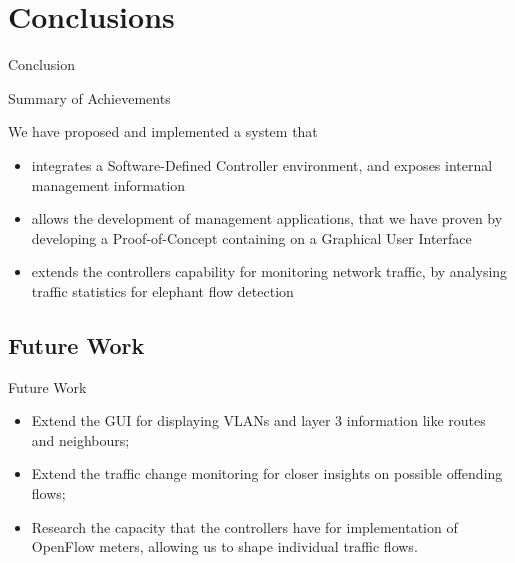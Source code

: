 \documentclass[aspectratio=43]{beamer}
\begin{document}
\section{Conclusions}
\begin{frame}[plain]
    \centering
        \Huge{Conclusion}
\end{frame}


\begin{frame}{Summary of Achievements}
    \item We have proposed and implemented a system that
    \begin{itemize}
        \item integrates a Software-Defined Controller environment, and exposes internal
            management information
        \item allows the development of management applications, that we have proven 
            by developing a Proof-of-Concept containing on a Graphical User Interface
        \item extends the controllers capability for monitoring network traffic, 
            by analysing traffic statistics for elephant flow detection
    \end{itemize}
\end{frame}

\subsection{Future Work}

\begin{frame}{Future Work}
    \begin{itemize}
        \item Extend the GUI for displaying VLANs and layer 3 information like routes and neighbours;
        \item Extend the traffic change monitoring for closer insights on possible offending flows;
        \item Research the capacity that the controllers have for implementation of OpenFlow meters,
            allowing us to shape individual traffic flows.
    \end{itemize}
\end{frame}
\end{document}

